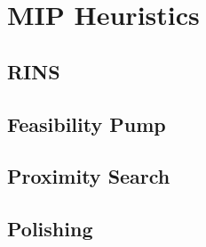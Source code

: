 \chapter{MIP Heuristics}

\section{RINS}
\section{Feasibility Pump}
\section{Proximity Search}
\section{Polishing}
